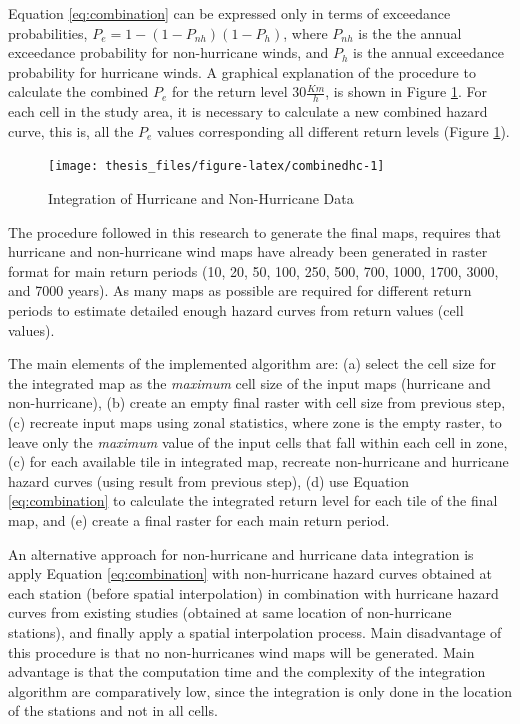 \documentclass[12pt,twoside]{reedthesis}
\begin{document}
Equation \eqref{eq:combination} can be expressed only in terms of exceedance probabilities, \(P_{e} = 1 - (1 -P_{nh}) (1 - P_{h})\), where \(P_{nh}\) is the the annual exceedance probability for non-hurricane winds, and \(P_{h}\) is the annual exceedance probability for hurricane winds. A graphical explanation of the procedure to calculate the combined \(P_e\) for the return level \(30\frac{Km}{h}\), is shown in Figure \ref{fig:combinedhc}. For each cell in the study area, it is necessary to calculate a new combined hazard curve, this is, all the \(P_e\) values corresponding all different return levels (Figure \ref{fig:combinedhc}).
\begin{figure}

{\centering \texttt{[image: thesis\_files/figure-latex/combinedhc-1]} 

}

\caption{Integration of Hurricane and Non-Hurricane Data}\label{fig:combinedhc}
\end{figure}
The procedure followed in this research to generate the final maps, requires that hurricane and non-hurricane wind maps have already been generated in raster format for main return periods (10, 20, 50, 100, 250, 500, 700, 1000, 1700, 3000, and 7000 years). As many maps as possible are required for different return periods to estimate detailed enough hazard curves from return values (cell values).

The main elements of the implemented algorithm are: (a) select the cell size for the integrated map as the \emph{maximum} cell size of the input maps (hurricane and non-hurricane), (b) create an empty final raster with cell size from previous step, (c) recreate input maps using zonal statistics, where zone is the empty raster, to leave only the \emph{maximum} value of the input cells that fall within each cell in zone, (c) for each available tile in integrated map, recreate non-hurricane and hurricane hazard curves (using result from previous step), (d) use Equation \eqref{eq:combination} to calculate the integrated return level for each tile of the final map, and (e) create a final raster for each main return period.

An alternative approach for non-hurricane and hurricane data integration is apply Equation \eqref{eq:combination} with non-hurricane hazard curves obtained at each station (before spatial interpolation) in combination with hurricane hazard curves from existing studies (obtained at same location of non-hurricane stations), and finally apply a spatial interpolation process. Main disadvantage of this procedure is that no non-hurricanes wind maps will be generated. Main advantage is that the computation time and the complexity of the integration algorithm are comparatively low, since the integration is only done in the location of the stations and not in all cells.
\end{document}
